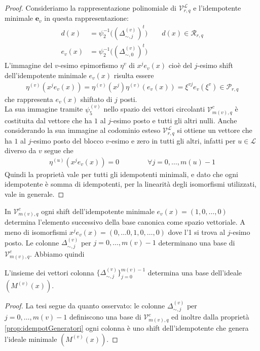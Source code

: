 \begin{proof}
   Consideriamo la rappresentazione polinomiale di $\mathcal{V}_{r, q}^{\mathscr{L}}$ e l'idempotente minimale $\mathbf{e}_{v}$ in questa rappresentazione:
   \begin{align*}
      d(x) &= \psi_{2}^{-1} \big( (\Delta_{\sim, j}^{(v)})^{t} \big) \qquad d(x) \in \mathcal{R}_{r,q} \\
      e_{v}(x) &= \psi_{2}^{-1} \big( (\Delta_{\sim, 0}^{(v)})^{t} \big)
   \end{align*}
   L'immagine del $v$-esimo epimorfismo $\eta^{v}$ di $x^{j}e_{v}(x)$ cioè del $j$-esimo shift dell'idempotente minimale $e_{v}(x)$ risulta essere
   \begin{align*}
      \eta^{(v)}(x^{j}e_{v}(x)) = \eta^{(v)}(x^{j}) \eta^{(v)}(e_{v}(x)) = \xi^{vj} e_{v}(\xi^{v}) \in \mathcal{P}_{r,q}
   \end{align*}
   che rappresenta $e_{v}(x)$ shiftato di $j$ posti.\\
   La sua immagine tramite $\psi_{5}^{(v)}$ nello spazio dei vettori circolanti $\mathcal{V}_{m(v), q}^{c}$ è costituita dal vettore che ha $1$ al $j$-esimo posto e tutti gli altri nulli.
   Anche considerando la sua immagine al codominio esteso $\mathcal{V}_{r, q}^{\mathscr{L}}$ si ottiene un vettore che ha $1$ al $j$-esimo posto del blocco $v$-esimo e zero in tutti gli altri, infatti per $u \in \mathscr{L}$ diverso da $v$ segue che
   \begin{align*}
      \eta^{(u)}(x^{j}e_{v}(x)) = 0 \qquad \qquad \forall j =0, \dots, m(u) - 1
   \end{align*}
   Quindi la proprietà vale per tutti gli idempotenti minimali, e dato che ogni idempotente è somma di idempotenti, per la linearità degli isomorfismi utilizzati, vale in generale.
\end{proof}

In $\mathcal{V}_{m(v), q}^{c}$ ogni shift dell'idempotente minimale $e_{v}(x) = (1,0,\dots , 0)$ determina l'elemento successivo della base canonica come spazio vettoriale. A meno di isomorfismi $x^{j}e_{v}(x) = (0,\dots 0,1,0,\dots , 0)$ dove l'1 si trova al $j$-esimo posto. Le colonne $\Delta_{\sim, j}^{(v)}$ per $j=0, \dots , m(v)-1$ determinano una base di $\mathcal{V}_{m(v), q}^{c}$. Abbiamo quindi
\begin{prop}
   L'insieme dei vettori colonna $\lbrace \Delta_{\sim, j}^{(v)} \rbrace_{j=0}^{m(v)-1}$ determina una base dell'ideale $(M^{(v)}(x))$.
\end{prop}
\begin{proof}
   La tesi segue da quanto osservato: le colonne $\Delta_{\sim, j}^{(v)}$ per $j=0, \dots , m(v)-1$ definiscono una base di $\mathcal{V}_{m(v), q}^{c}$ ed inoltre dalla proprietà \ref{prop:idempotGeneratori} ogni colonna è uno shift dell'idempotente che genera l'ideale minimale $(M^{(v)}(x))$.
\end{proof}

